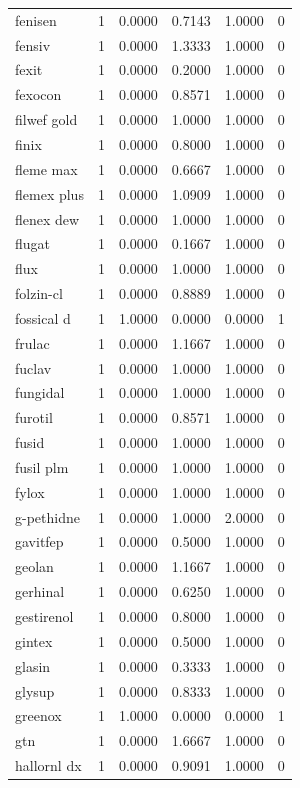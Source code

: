 \begin{longtable}{p{3.0cm}rrrrr}
fenisen & 1 & 0.0000 & 0.7143 & 1.0000 & 0 \\
fensiv & 1 & 0.0000 & 1.3333 & 1.0000 & 0 \\
fexit & 1 & 0.0000 & 0.2000 & 1.0000 & 0 \\
fexocon & 1 & 0.0000 & 0.8571 & 1.0000 & 0 \\
filwef gold & 1 & 0.0000 & 1.0000 & 1.0000 & 0 \\
finix & 1 & 0.0000 & 0.8000 & 1.0000 & 0 \\
fleme max & 1 & 0.0000 & 0.6667 & 1.0000 & 0 \\
flemex plus & 1 & 0.0000 & 1.0909 & 1.0000 & 0 \\
flenex dew & 1 & 0.0000 & 1.0000 & 1.0000 & 0 \\
flugat & 1 & 0.0000 & 0.1667 & 1.0000 & 0 \\
flux & 1 & 0.0000 & 1.0000 & 1.0000 & 0 \\
folzin-cl & 1 & 0.0000 & 0.8889 & 1.0000 & 0 \\
fossical d & 1 & 1.0000 & 0.0000 & 0.0000 & 1 \\
frulac & 1 & 0.0000 & 1.1667 & 1.0000 & 0 \\
fuclav & 1 & 0.0000 & 1.0000 & 1.0000 & 0 \\
fungidal & 1 & 0.0000 & 1.0000 & 1.0000 & 0 \\
furotil & 1 & 0.0000 & 0.8571 & 1.0000 & 0 \\
fusid & 1 & 0.0000 & 1.0000 & 1.0000 & 0 \\
fusil plm & 1 & 0.0000 & 1.0000 & 1.0000 & 0 \\
fylox & 1 & 0.0000 & 1.0000 & 1.0000 & 0 \\
g-pethidne & 1 & 0.0000 & 1.0000 & 2.0000 & 0 \\
gavitfep & 1 & 0.0000 & 0.5000 & 1.0000 & 0 \\
geolan & 1 & 0.0000 & 1.1667 & 1.0000 & 0 \\
gerhinal & 1 & 0.0000 & 0.6250 & 1.0000 & 0 \\
gestirenol & 1 & 0.0000 & 0.8000 & 1.0000 & 0 \\
gintex & 1 & 0.0000 & 0.5000 & 1.0000 & 0 \\
glasin & 1 & 0.0000 & 0.3333 & 1.0000 & 0 \\
glysup & 1 & 0.0000 & 0.8333 & 1.0000 & 0 \\
greenox & 1 & 1.0000 & 0.0000 & 0.0000 & 1 \\
gtn & 1 & 0.0000 & 1.6667 & 1.0000 & 0 \\
hallornl dx & 1 & 0.0000 & 0.9091 & 1.0000 & 0 \\

\end{longtable}
